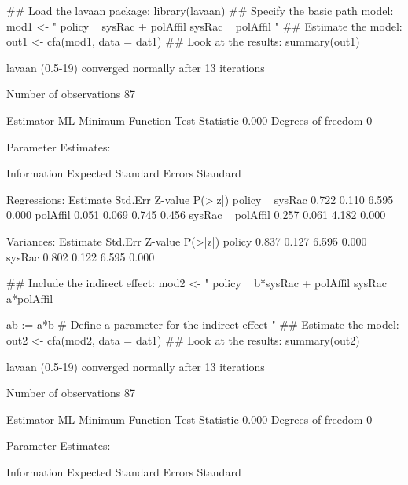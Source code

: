 \begin{Schunk}
\begin{Sinput}
 ## Load the lavaan package:
 library(lavaan)
 ## Specify the basic path model:
 mod1 <- "
 policy ~ sysRac + polAffil
 sysRac ~ polAffil
 "
 ## Estimate the model:
 out1 <- cfa(mod1, data = dat1)
 ## Look at the results:
 summary(out1)
\end{Sinput}
\begin{Soutput}
lavaan (0.5-19) converged normally after  13 iterations

  Number of observations                            87

  Estimator                                         ML
  Minimum Function Test Statistic                0.000
  Degrees of freedom                                 0

Parameter Estimates:

  Information                                 Expected
  Standard Errors                             Standard

Regressions:
                   Estimate  Std.Err  Z-value  P(>|z|)
  policy ~                                            
    sysRac            0.722    0.110    6.595    0.000
    polAffil          0.051    0.069    0.745    0.456
  sysRac ~                                            
    polAffil          0.257    0.061    4.182    0.000

Variances:
                   Estimate  Std.Err  Z-value  P(>|z|)
    policy            0.837    0.127    6.595    0.000
    sysRac            0.802    0.122    6.595    0.000
\end{Soutput}
\begin{Sinput}
 ## Include the indirect effect:
 mod2 <- "
 policy ~ b*sysRac + polAffil
 sysRac ~ a*polAffil
 
 ab := a*b # Define a parameter for the indirect effect
 "
 ## Estimate the model:
 out2 <- cfa(mod2, data = dat1)
 ## Look at the results:
 summary(out2)
\end{Sinput}
\begin{Soutput}
lavaan (0.5-19) converged normally after  13 iterations

  Number of observations                            87

  Estimator                                         ML
  Minimum Function Test Statistic                0.000
  Degrees of freedom                                 0

Parameter Estimates:

  Information                                 Expected
  Standard Errors                             Standard


\end{Soutput}
\end{Schunk}
